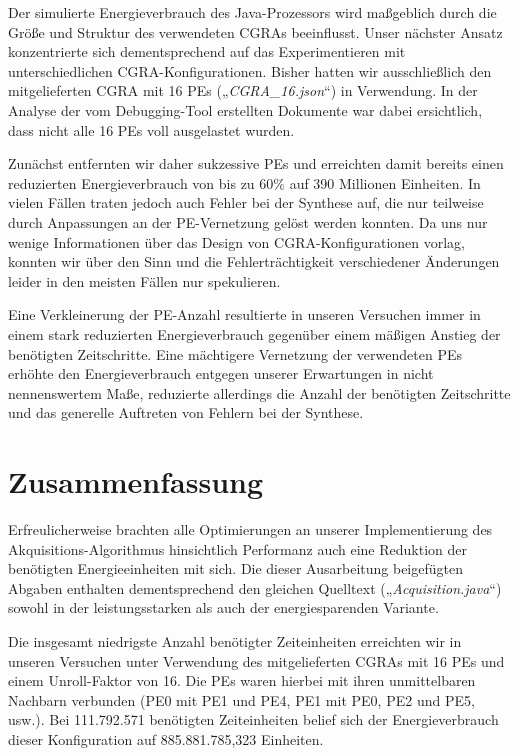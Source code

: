 \documentclass[parskip,
							 oneside,
							 11pt,
							 noheadingspace,
							 accentcolor=tud1d,
							 bigchapter,
							 colorback]{tudreport}
\begin{document}
Der simulierte Energieverbrauch des Java-Prozessors wird maßgeblich durch die Größe und Struktur des verwendeten CGRAs beeinflusst. Unser nächster Ansatz konzentrierte sich dementsprechend auf das Experimentieren mit unterschiedlichen CGRA-Konfigurationen. Bisher hatten wir ausschließlich den mitgelieferten CGRA mit 16 PEs („\emph{CGRA\_16.json}“) in Verwendung. In der Analyse der vom Debugging-Tool erstellten Dokumente war dabei ersichtlich, dass nicht alle 16 PEs voll ausgelastet wurden.

Zunächst entfernten wir daher sukzessive PEs und erreichten damit bereits einen reduzierten Energieverbrauch von bis zu 60\% auf 390 Millionen Einheiten. In vielen Fällen traten jedoch auch Fehler bei der Synthese auf, die nur teilweise durch Anpassungen an der PE-Vernetzung gelöst werden konnten. Da uns nur wenige Informationen über das Design von CGRA-Konfigurationen vorlag, konnten wir über den Sinn und die Fehlerträchtigkeit verschiedener Änderungen leider in den meisten Fällen nur spekulieren.

Eine Verkleinerung der PE-Anzahl resultierte in unseren Versuchen immer in einem stark reduzierten Energieverbrauch gegenüber einem mäßigen Anstieg der benötigten Zeitschritte. Eine mächtigere Vernetzung der verwendeten PEs erhöhte den Energieverbrauch entgegen unserer Erwartungen in nicht nennenswertem Maße, reduzierte allerdings die Anzahl der benötigten Zeitschritte und das generelle Auftreten von Fehlern bei der Synthese.

\chapter{Zusammenfassung}
Erfreulicherweise brachten alle Optimierungen an unserer Implementierung des Akquisitions-Algorithmus hinsichtlich Performanz auch eine Reduktion der benötigten Energieeinheiten mit sich. Die dieser Ausarbeitung beigefügten Abgaben enthalten dementsprechend den gleichen Quelltext („\emph{Acquisition.java}“) sowohl in der leistungsstarken als auch der energiesparenden Variante.

Die insgesamt niedrigste Anzahl benötigter Zeiteinheiten erreichten wir in unseren Versuchen unter Verwendung des mitgelieferten CGRAs mit 16 PEs und einem Unroll-Faktor von 16. Die PEs waren hierbei mit ihren unmittelbaren Nachbarn verbunden (PE0 mit PE1 und PE4, PE1 mit PE0, PE2 und PE5, usw.). Bei 111.792.571 benötigten Zeiteinheiten belief sich der Energieverbrauch dieser Konfiguration auf 885.881.785,323  Einheiten.
\end{document}

